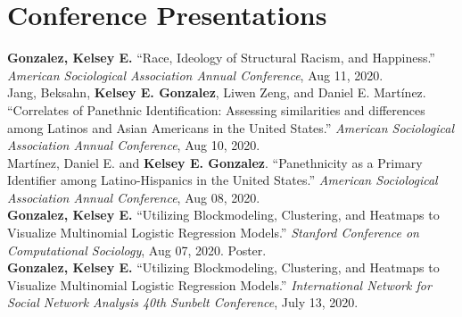 \section*{Conference Presentations}

\textbf{Gonzalez, Kelsey E.} 
``Race, Ideology of Structural Racism, and Happiness.'' 
\emph{American Sociological Association Annual Conference}, Aug 11, 2020.\\


\years{}
Jang, Beksahn, \textbf{Kelsey E. Gonzalez}, Liwen Zeng, and Daniel E. Martínez.
``Correlates of Panethnic Identification: Assessing similarities and differences among Latinos and Asian Americans in the United States.''
\emph{American Sociological Association Annual Conference}, Aug 10, 2020. \\


\years{}
Martínez, Daniel E. and \textbf{Kelsey E. Gonzalez}. 
``Panethnicity as a Primary Identifier among Latino-Hispanics in the United States.''
\emph{American Sociological Association Annual Conference}, Aug 08, 2020.  \\


\years{}
\textbf{Gonzalez, Kelsey E.} 
``Utilizing Blockmodeling, Clustering, and Heatmaps to Visualize Multinomial Logistic Regression Models.''
\emph{Stanford Conference on Computational Sociology}, Aug 07, 2020. Poster.  \\


\years{} 
\textbf{Gonzalez, Kelsey E.} 
``Utilizing Blockmodeling, Clustering, and Heatmaps to Visualize Multinomial Logistic Regression Models.''
\emph{International Network for Social Network Analysis 40th Sunbelt Conference},  July 13, 2020. \\


\begin{comment}
\years{}
Bergesen, Albert and \textbf{Kelsey E. Gonzalez}. 
``Putting the "Geo" back in Geopolitics.'' (non-presenter)
\emph{International Studies Association Annual Conference}, March 25, 2020. Honolulu, HI.
\end{comment}

